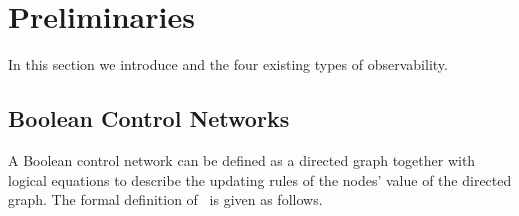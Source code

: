\section{Preliminaries} 
\label{sec:pre}
In this section we introduce {\BCNs} and the four existing types of observability. 

\subsection{Boolean Control Networks}

A Boolean control network can be defined as a directed graph together with logical equations to describe the updating rules of the nodes' value of the directed graph. The formal definition of \BCN\ is given as follows. 

